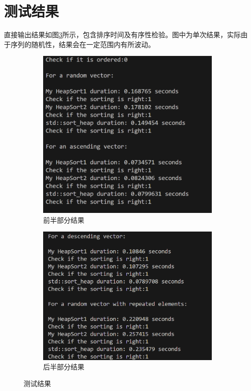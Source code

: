 \documentclass[UTF8]{ctexart}
\begin{document}
\section{测试结果}
直接输出结果如图\ref{fig:测试结果}所示，包含排序时间及有序性检验。图中为单次结果，实际由于序列的随机性，结果会在一定范围内有所波动。
\begin{figure}[H]
    \centering
    \begin{subfigure}{0.45\textwidth}
        \centering
        \includegraphics[width=\textwidth]{result1.png}
        \caption{前半部分结果}
        \label{fig:结果1}
    \end{subfigure}
    \hfill
    \begin{subfigure}{0.45\textwidth}
        \centering
        \includegraphics[width=\textwidth]{result2.png}
        \caption{后半部分结果}
        \label{fig:结果2}
    \end{subfigure}
    \caption{测试结果}
    \label{fig:测试结果}
\end{figure}
\end{document}
